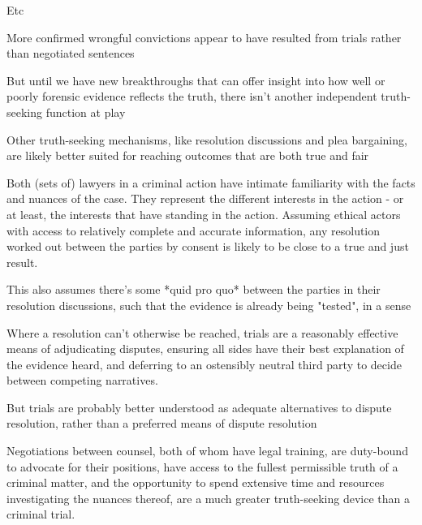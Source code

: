 Etc

More confirmed wrongful convictions appear to have resulted from trials rather than negotiated sentences

But until we have new breakthroughs that can offer insight into how well or poorly forensic evidence reflects the truth, there isn't another independent truth-seeking function at play

Other truth-seeking mechanisms, like resolution discussions and plea bargaining, are likely better suited for reaching outcomes that are both true and fair

Both (sets of) lawyers in a criminal action have intimate familiarity with the facts and nuances of the case. They represent the different interests in the action - or at least, the interests that have standing in the action. Assuming ethical actors with access to relatively complete and accurate information, any resolution worked out between the parties by consent is likely to be close to a true and just result.

This also assumes there's some *quid pro quo* between the parties in their resolution discussions, such that the evidence is already being "tested", in a sense

Where a resolution can't otherwise be reached, trials are a reasonably effective means of adjudicating disputes, ensuring all sides have their best explanation of the evidence heard, and deferring to an ostensibly neutral third party to decide between competing narratives.

But trials are probably better understood as adequate alternatives to dispute resolution, rather than a preferred means of dispute resolution

Negotiations between counsel, both of whom have legal training, are duty-bound to advocate for their positions, have access to the fullest permissible truth of a criminal matter, and the opportunity to spend extensive time and resources investigating the nuances thereof, are a much greater truth-seeking device than a criminal trial.